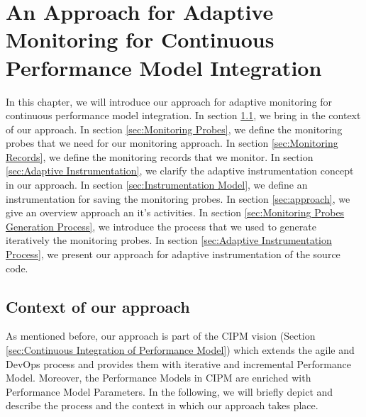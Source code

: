 

\chapter{An Approach for Adaptive Monitoring for Continuous Performance Model Integration}
\label{ch:An Approach for Adaptive Monitoring for Continuous Performance Model Integration}
In this chapter, we will introduce our approach for adaptive monitoring for continuous performance model integration. In section \ref{sec:Context of our approach}, we bring in the context of our approach. In section \ref{sec:Monitoring Probes}, we define the monitoring probes that we need for our monitoring approach. In section \ref{sec:Monitoring Records}, we define the monitoring records that we monitor. In section \ref{sec:Adaptive Instrumentation}, we clarify the adaptive instrumentation concept in our approach. In section \ref{sec:Instrumentation Model}, we define an instrumentation for saving the monitoring probes. In section \ref{sec:approach}, we give an overview approach an it's activities. In section \ref{sec:Monitoring Probes Generation Process}, we introduce the process that we used to generate iteratively the monitoring probes. In section \ref{sec:Adaptive Instrumentation Process}, we present our approach for adaptive instrumentation of the source code. 

\section{Context of our approach}
\label{sec:Context of our approach}
As mentioned before, our approach is part of the CIPM vision (Section \ref{sec:Continuous Integration of Performance Model}) which extends the agile and DevOps process and provides them with iterative and incremental Performance Model. Moreover, the Performance Models in CIPM are enriched with Performance Model Parameters. In the following, we will briefly depict and describe the process and the context in which our approach takes place.\\

